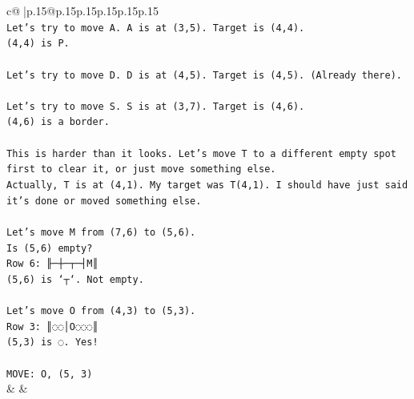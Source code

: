 \documentclass{article}
\begin{document}
{\begin{supertabular}{c@{$\;$}|p{.15\linewidth}@{}p{.15\linewidth}p{.15\linewidth}p{.15\linewidth}p{.15\linewidth}p{.15\linewidth}}
{{{\\ 
\texttt{Let's try to move A. A is at (3,5). Target is (4,4).} \\
\texttt{(4,4) is P.} \\
\\ 
\texttt{Let's try to move D. D is at (4,5). Target is (4,5). (Already there).} \\
\\ 
\texttt{Let's try to move S. S is at (3,7). Target is (4,6).} \\
\texttt{(4,6) is a border.} \\
\\ 
\texttt{This is harder than it looks. Let's move T to a different empty spot first to clear it, or just move something else.} \\
\texttt{Actually, T is at (4,1). My target was T(4,1). I should have just said it's done or moved something else.} \\
\\ 
\texttt{Let's move M from (7,6) to (5,6).} \\
\texttt{Is (5,6) empty?} \\
\texttt{Row 6: ╟─┼─┬─┤M║} \\
\texttt{(5,6) is `┬`. Not empty.} \\
\\ 
\texttt{Let's move O from (4,3) to (5,3).} \\
\texttt{Row 3: ║◌◌│O◌◌◌║} \\
\texttt{(5,3) is ◌. Yes!} \\
\\ 
\texttt{MOVE: O, (5, 3)} \\
            }
        }
    }
    & & \\ \\


\end{supertabular}}
\end{document}
